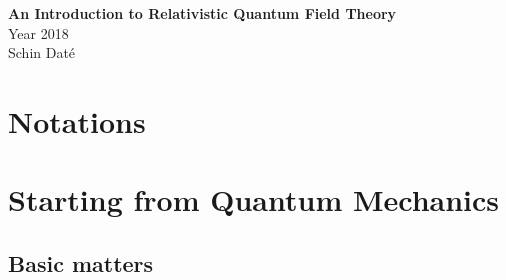 \documentclass[12pt]{article}
\newcommand{\myqftsrcdirectory}[0]{myqft/src}
\newcounter{problem}
\begin{document}
\begin{titlepage} 
\vspace*{3cm}
\vspace*{2cm}
\noindent
\begin{center}
{\Huge \bf An Introduction to Relativistic Quantum Field Theory\\}  
\vspace{1cm}
{\large Year 2018}
\vspace{1cm}
\\
{\Large 
Schin Dat\'e}
\end{center}
\end{titlepage} 



\tableofcontents

\thispagestyle{empty}



\setcounter{page}{0}
\setcounter{section}{-1}

\newpage %

\section{Notations}

%


\setcounter{footnote}{0}
\setcounter{equation}{0}
\setcounter{figure}{0}
\setcounter{problem}{0}

\newpage
\section{Starting from Quantum Mechanics}
\subsection{Basic matters}

\end{document}
